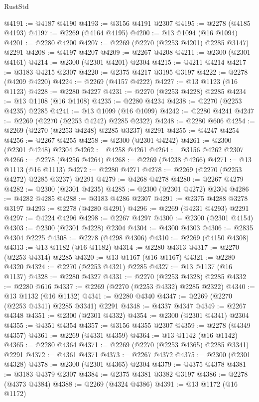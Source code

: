 \begin{lexlean}{RustStd}
\begin{coremodule}
{\begin{coremodule}
{{{{{{{{{{{{@4191 := @4187 @4190
@4193 := @3156 @4191 @2307
@4195 := @2278 (@4185 @4193)
@4197 := @2269 (@4164 @4195)
@4200 := @13 @1094 (@16 @1094)
@4201 := @2280 @4200
@4207 := @2269 (@2270 (@2253 @4201) @2285 @3147) @2291
@4208 := @4197 @4207
@4209 := @2267 @4208
@4211 := @2300 (@2301 @4161)
@4214 := @2300 (@2301 @4201) @2304
@4215 := @4211 @4214
@4217 := @3183 @4215 @2307
@4220 := @2375 @4217 @3195 @3197
@4222 := @2278 (@4209 @4220)
@4224 := @2269 (@4157 @4222)
@4227 := @13 @1123 (@16 @1123)
@4228 := @2280 @4227
@4231 := @2270 (@2253 @4228) @2285
@4234 := @13 @1108 (@16 @1108)
@4235 := @2280 @4234
@4238 := @2270 (@2253 @4235) @2285
@4241 := @13 @1099 (@16 @1099)
@4242 := @2280 @4241
@4247 := @2269 (@2270 (@2253 @4242) @2285 @2322)
@4248 := @2280 @606
@4254 := @2269 (@2270 (@2253 @4248) @2285 @3237) @2291
@4255 := @4247 @4254
@4256 := @2267 @4255
@4258 := @2300 (@2301 @4242)
@4261 := @2300 (@2301 @4248) @2304
@4262 := @4258 @4261
@4264 := @3156 @4262 @2307
@4266 := @2278 (@4256 @4264)
@4268 := @2269 (@4238 @4266)
@4271 := @13 @1113 (@16 @1113)
@4272 := @2280 @4271
@4278 := @2269 (@2270 (@2253 @4272) @2285 @3237) @2291
@4279 := @4268 @4278
@4280 := @2267 @4279
@4282 := @2300 (@2301 @4235)
@4285 := @2300 (@2301 @4272) @2304
@4286 := @4282 @4285
@4288 := @3183 @4286 @2307
@4291 := @2375 @4288 @3278 @3197
@4293 := @2278 (@4280 @4291)
@4296 := @2269 (@4231 @4293) @2291
@4297 := @4224 @4296
@4298 := @2267 @4297
@4300 := @2300 (@2301 @4154)
@4303 := @2300 (@2301 @4228) @2304
@4304 := @4300 @4303
@4306 := @2835 @4304 @2225
@4308 := @2278 (@4298 @4306)
@4310 := @2269 (@4150 @4308)
@4313 := @13 @1182 (@16 @1182)
@4314 := @2280 @4313
@4317 := @2270 (@2253 @4314) @2285
@4320 := @13 @1167 (@16 @1167)
@4321 := @2280 @4320
@4324 := @2270 (@2253 @4321) @2285
@4327 := @13 @1137 (@16 @1137)
@4328 := @2280 @4327
@4331 := @2270 (@2253 @4328) @2285
@4332 := @2280 @616
@4337 := @2269 (@2270 (@2253 @4332) @2285 @2322)
@4340 := @13 @1132 (@16 @1132)
@4341 := @2280 @4340
@4347 := @2269 (@2270 (@2253 @4341) @2285 @3341) @2291
@4348 := @4337 @4347
@4349 := @2267 @4348
@4351 := @2300 (@2301 @4332)
@4354 := @2300 (@2301 @4341) @2304
@4355 := @4351 @4354
@4357 := @3156 @4355 @2307
@4359 := @2278 (@4349 @4357)
@4361 := @2269 (@4331 @4359)
@4364 := @13 @1142 (@16 @1142)
@4365 := @2280 @4364
@4371 := @2269 (@2270 (@2253 @4365) @2285 @3341) @2291
@4372 := @4361 @4371
@4373 := @2267 @4372
@4375 := @2300 (@2301 @4328)
@4378 := @2300 (@2301 @4365) @2304
@4379 := @4375 @4378
@4381 := @3183 @4379 @2307
@4384 := @2375 @4381 @3382 @3197
@4386 := @2278 (@4373 @4384)
@4388 := @2269 (@4324 @4386)
@4391 := @13 @1172 (@16 @1172)
}}}}}}}}}}}}
\end{coremodule}}
\end{coremodule}
\end{lexlean}
